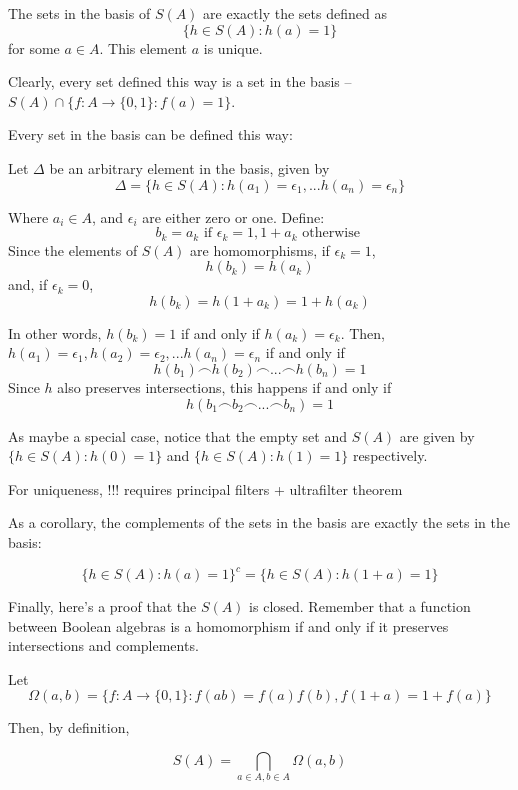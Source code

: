 \documentclass{article}
\begin{document}
      The sets in the basis of $S(A)$ are exactly the sets defined as
      \[\{h\in S(A): h(a) = 1\}\]
      for some $a \in A$. This element $a$ is unique.

      Clearly, every set defined this way is a set in the basis -- $S(A) \cap
      \{f: A \rightarrow \{0,1\} : f(a) = 1\}$.

      Every set in the basis can be defined this way:

      Let $\Delta$ be an arbitrary element in the basis, given by
      \[\Delta = \{h \in S(A) : h(a_1) = \epsilon_1, ... h(a_n) = \epsilon_n\}\]

      Where $a_i \in A$, and $\epsilon_i$ are either zero or one. Define:
      \[b_k = a_k \text{ if } \epsilon_k = 1, 1+a_k \text{ otherwise }\]
      Since the elements of $S(A)$ are homomorphisms, if $\epsilon_k = 1$,
      \[h(b_k) = h(a_k)\]
      and, if $\epsilon_k = 0$,
      \[h(b_k) = h(1+a_k) = 1+h(a_k)\]

      In other words, $h(b_k) = 1$ if and only if $h(a_k) = \epsilon_k$. Then,
      $h(a_1) = \epsilon_1, h(a_2) = \epsilon_2, ... h(a_n) = \epsilon_n$
      if and only if
      \[h(b_1) \frown h(b_2) \frown ... \frown h(b_n) = 1\]
      Since $h$ also preserves intersections, this happens if and only if
      \[h(b_1 \frown b_2 \frown ... \frown b_n) = 1\]

      As maybe a special case, notice that the empty set and $S(A)$ are given
      by $\{h \in S(A) : h(0) = 1\}$ and $\{h \in S(A) : h(1) = 1\}$
      respectively.



      For uniqueness, !!! requires principal filters + ultrafilter theorem

      As a corollary, the complements of the sets in the basis are exactly the
      sets in the basis:

      \[\{h \in S(A) : h(a) = 1\}^c = \{h \in S(A) : h(1+a) = 1\}\]

      Finally, here's a proof that the $S(A)$ is closed. Remember that a
      function between Boolean algebras is a homomorphism if and only if it
      preserves intersections and complements.

      Let
      \[\Omega(a,b) = \{ f: A \rightarrow \{0,1\} : f(ab) = f(a)f(b), f(1+a) = 1
      + f(a)\}\]

      Then, by definition,

      \[S(A) = \bigcap_{a \in A, b \in A} \Omega(a,b)\]
\end{document}
